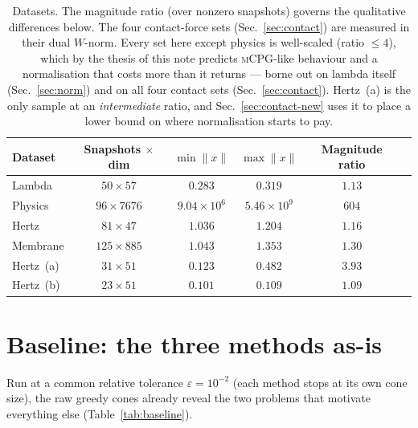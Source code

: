 \documentclass[11pt]{article}
\newcommand{\mCPG}{\textsc{mCPG}}
\begin{document}
\begin{table}[htbp]
  \centering
  \caption{Datasets. The magnitude ratio (over nonzero snapshots) governs the
    qualitative differences below. The four contact-force sets
    (Sec.~\ref{sec:contact}) are measured in their dual $W$-norm. Every set here
    except physics is well-scaled (ratio $\le4$), which by the thesis of this note
    predicts \mCPG-like behaviour and a normalisation that costs more than it
    returns --- borne out on lambda itself (Sec.~\ref{sec:norm}) and on all four
    contact sets (Sec.~\ref{sec:contact}). Hertz~(a) is the only sample at an
    \emph{intermediate} ratio, and Sec.~\ref{sec:contact-new} uses it to place a
    lower bound on where normalisation starts to pay.}
  \label{tab:datasets}
  \begin{tabular}{lccccc}
    \toprule
    Dataset & Snapshots $\times$ dim & $\min\|x\|$ & $\max\|x\|$ & Magnitude ratio \\
    \midrule
    Lambda   & $50\times57$   & $0.283$            & $0.319$            & $1.13$ \\
    Physics  & $96\times7676$ & $9.04\times10^{6}$ & $5.46\times10^{9}$ & $604$  \\
    \midrule
    Hertz      & $81\times47$   & $1.036$ & $1.204$ & $1.16$ \\
    Membrane   & $125\times885$ & $1.043$ & $1.353$ & $1.30$ \\
    Hertz~(a)  & $31\times51$   & $0.123$ & $0.482$ & $3.93$ \\
    Hertz~(b)  & $23\times51$   & $0.101$ & $0.109$ & $1.09$ \\
    \bottomrule
  \end{tabular}
\end{table}

\section{Baseline: the three methods as-is}

Run at a common relative tolerance $\varepsilon=10^{-2}$ (each method stops at its
own cone size), the raw greedy cones already reveal the two problems that motivate
everything else (Table~\ref{tab:baseline}).
\end{document}
